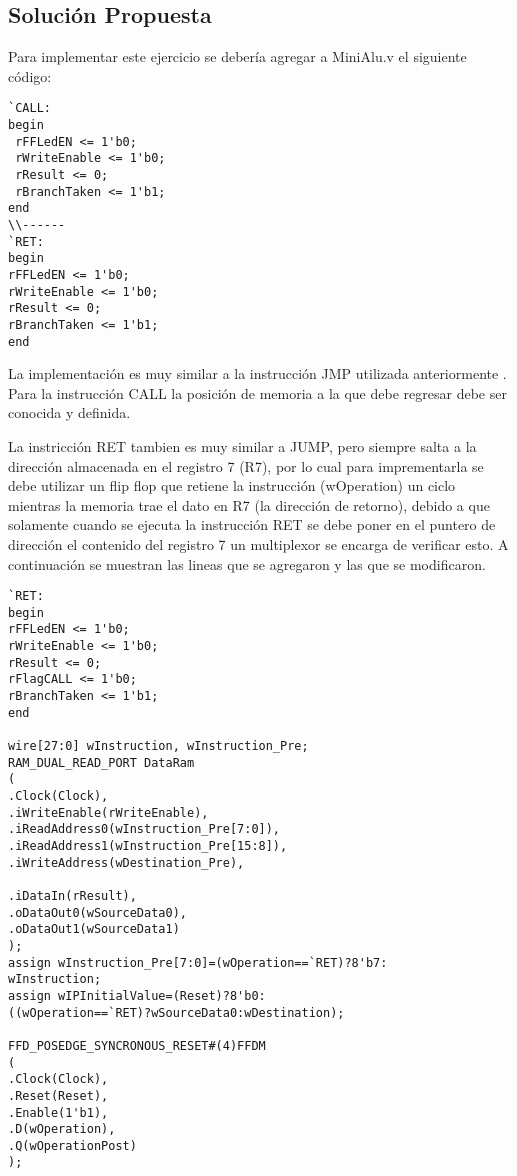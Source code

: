 \documentclass[10pt]{article}
\begin{document}
\subsection*{Solución Propuesta}

Para implementar este ejercicio se debería agregar a MiniAlu.v el siguiente código:

\begin{lstlisting}
`CALL:
begin
 rFFLedEN <= 1'b0;
 rWriteEnable <= 1'b0;
 rResult <= 0;
 rBranchTaken <= 1'b1;
end
\\------
`RET:
begin
rFFLedEN <= 1'b0;
rWriteEnable <= 1'b0;
rResult <= 0;
rBranchTaken <= 1'b1;
end
\end{lstlisting}

La implementación es muy similar a la instrucción JMP utilizada anteriormente . Para la instrucción CALL la
posición de memoria a la que debe regresar debe ser conocida y definida.

La instricción RET tambien es muy similar a JUMP, pero siempre salta a la dirección almacenada en el registro 7 (R7), por lo cual para imprementarla se debe utilizar un flip flop que retiene la instrucción (wOperation) un ciclo mientras la memoria trae el dato en R7 (la dirección de retorno), debido a que solamente cuando se ejecuta la instrucción RET se debe poner en el puntero de dirección el contenido del registro 7 un multiplexor se encarga de verificar esto. A continuación se muestran las lineas que se agregaron y las que se modificaron.

\begin{lstlisting}
`RET:
begin
rFFLedEN <= 1'b0;
rWriteEnable <= 1'b0;
rResult <= 0;
rFlagCALL <= 1'b0;
rBranchTaken <= 1'b1;
end

wire[27:0] wInstruction, wInstruction_Pre;
RAM_DUAL_READ_PORT DataRam
(
.Clock(Clock),
.iWriteEnable(rWriteEnable),
.iReadAddress0(wInstruction_Pre[7:0]),
.iReadAddress1(wInstruction_Pre[15:8]),
.iWriteAddress(wDestination_Pre),

.iDataIn(rResult),
.oDataOut0(wSourceData0),
.oDataOut1(wSourceData1)
);
assign wInstruction_Pre[7:0]=(wOperation==`RET)?8'b7:
wInstruction;
assign wIPInitialValue=(Reset)?8'b0:
((wOperation==`RET)?wSourceData0:wDestination);

FFD_POSEDGE_SYNCRONOUS_RESET#(4)FFDM
(
.Clock(Clock),
.Reset(Reset),
.Enable(1'b1),
.D(wOperation),
.Q(wOperationPost)
);
\end{lstlisting}
\end{document}
